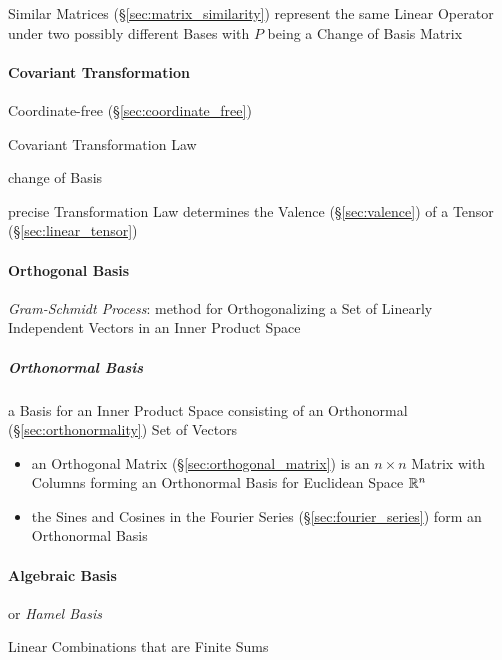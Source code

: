 Similar Matrices (\S\ref{sec:matrix_similarity}) represent the same Linear
Operator under two possibly different Bases with $P$ being a Change of Basis
Matrix



\paragraph{Covariant Transformation}\label{sec:covariant_transformation}\hfill

Coordinate-free (\S\ref{sec:coordinate_free})

Covariant Transformation Law

change of Basis

precise Transformation Law determines the Valence
(\S\ref{sec:valence}) of a Tensor (\S\ref{sec:linear_tensor})



\paragraph{Orthogonal Basis}\label{sec:orthogonal_basis}\hfill

\emph{Gram-Schmidt Process}: method for Orthogonalizing a Set of Linearly
Independent Vectors in an Inner Product Space



\subparagraph{Orthonormal Basis}\label{sec:orthonormal_basis}\hfill

a Basis for an Inner Product Space consisting of an Orthonormal
(\S\ref{sec:orthonormality}) Set of Vectors

\begin{itemize}
  \item an Orthogonal Matrix (\S\ref{sec:orthogonal_matrix}) is an $n \times n$
    Matrix with Columns forming an Orthonormal Basis for Euclidean Space
    $\mathbb{R}^n$
  \item the Sines and Cosines in the Fourier Series
    (\S\ref{sec:fourier_series}) form an Orthonormal Basis
\end{itemize}



\paragraph{Algebraic Basis}\label{sec:algebraic_basis}\hfill

or \emph{Hamel Basis}

Linear Combinations that are Finite Sums

